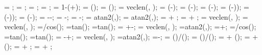 {{\lenfleft = \lenf*\midratioleft;
\loaddxfright = \loaddxf*\midratioright;
\loaddyfright = \loaddyf*\midratioright;
\lenfright = \lenf*\midratioright;
\arrforceratio= 1-(\loadstartratio+\loadendratio);
\loaddxa = \loaddxf*(\arrforceratio); %
\loaddya = \loaddyf*(\arrforceratio); %
\lena = veclen(\loaddxa, \loaddya);
\loaddxaleft = \loaddxf*(\midratioleft-\loadstartratio); %
\loaddyaleft = \loaddyf*(\midratioleft-\loadstartratio); %
\lenaleft = \lenf*(\midratioleft-\loadstartratio);
\loaddxaright = \loaddxf*(\midratioright-\loadendratio)); %
\loaddyaright = \loaddyf*(\midratioright-\loadendratio)); %
\lenaright = \lenf*(\midratioright-\loadendratio);
\lenamid = \lena-\lenaleft-\lenaright;
\dahleft = \loadarrowheightmid-\loadarrowheightleft;
\dahright = \loadarrowheightmid-\loadarrowheightright;
\ldangleleft = atan2(\dahleft,\lenaleft);
\ldangleright = atan2(\dahright,\lenaright);
\totalangleleft = \loadangle + \ldangleleft;
\totalangleright = \loadangle + \ldangleright;
\totallengthleft = veclen(\lenaleft, \dahleft); %
\totallengthright = veclen(\lenaright, \dahright); %
\loadarrowlenleftnew=\loadarrowheightleft/cos(\extraangle);
\loadarrowleftshifta=\loadarrowheightleft*tan(\extraangle);
\loadarrowleftshiftb=\loadarrowheightmid*tan(\extraangle);
\lenaleftshift= \lenaleft+\loadarrowleftshiftb-\loadarrowleftshifta;
\totallengthleftnew = veclen(\lenaleftshift, \dahleft);
\newangleleft=atan2(\dahleft,\lenaleftshift);
\totalangleleftnew=\loadangle+\newangleleft;
%
\loadarrowlenrightnew=\loadarrowheightright/cos(\extraangle);
\loadarrowrightshifta=\loadarrowheightright*tan(\extraangle);
\loadarrowrightshiftb=\loadarrowheightmid*tan(\extraangle);
\lenarightshift= \lenaright-\loadarrowrightshiftb+\loadarrowrightshifta;
\totallengthrightnew = veclen(\lenarightshift, \dahright);
\newangleright=atan2(\dahright,\lenarightshift);
\totalanglerightnew=\loadangle-\newangleright;
\loadwxvalue = (\loaddxa)/(); %
\loadwyvalue = (\loaddya)/(); %
 = \loadstartcoordx + \loaddxf*(\loadstartratio);
 = \loadstartcoordy + \loaddyf*(\loadstartratio);
\loadxvalue{\loadarrownumber} =  + \loaddxa;
\loadyvalue{\loadarrownumber} =  + \loaddya;
}}
